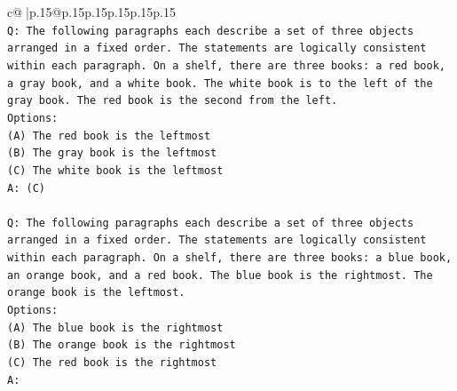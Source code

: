 \documentclass{article}
\begin{document}
{\begin{supertabular}{c@{$\;$}|p{.15\linewidth}@{}p{.15\linewidth}p{.15\linewidth}p{.15\linewidth}p{.15\linewidth}p{.15\linewidth}}
{{{\\ 
\texttt{Q: The following paragraphs each describe a set of three objects arranged in a fixed order. The statements are logically consistent within each paragraph. On a shelf, there are three books: a red book, a gray book, and a white book. The white book is to the left of the gray book. The red book is the second from the left.} \\
\texttt{Options:} \\
\texttt{(A) The red book is the leftmost} \\
\texttt{(B) The gray book is the leftmost} \\
\texttt{(C) The white book is the leftmost} \\
\texttt{A: (C)} \\
\\ 
\texttt{Q: The following paragraphs each describe a set of three objects arranged in a fixed order. The statements are logically consistent within each paragraph. On a shelf, there are three books: a blue book, an orange book, and a red book. The blue book is the rightmost. The orange book is the leftmost.} \\
\texttt{Options:} \\
\texttt{(A) The blue book is the rightmost} \\
\texttt{(B) The orange book is the rightmost} \\
\texttt{(C) The red book is the rightmost} \\
\texttt{A:} \\
            }
        }
    }
     \\ \\


\end{supertabular}}
\end{document}
